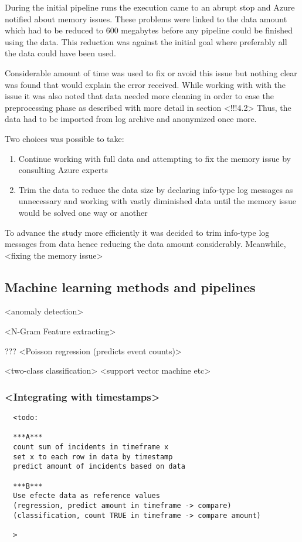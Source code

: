 \documentclass[english, 12pt, a4paper, elec, utf8, a-1b, online]{aaltothesis}
\begin{document}
During the initial pipeline runs
the execution came to an abrupt stop
and Azure notified about memory issues.
These problems were linked to the data amount
which had to be reduced to 600 megabytes
before any pipeline could be finished using the data.
This reduction was against the initial goal
where preferably all the data could have been used.

Considerable amount of time was used
to fix or avoid this issue
but nothing clear was found
that would explain the error received.
While working with with the issue
it was also noted
that data needed more cleaning
in order to ease the preprocessing phase
as described with more detail in section <!!!4.2>
Thus,
the data had to be imported from log archive
and anonymized once more.

Two choices was possible to take:
\begin{enumerate}
  \item Continue working with full data
  and attempting to fix the memory issue
  by consulting Azure experts
  \item  Trim the data to reduce the data size
  by declaring info-type log messages
  as unnecessary
  and working with vastly diminished data
  until the memory issue would be solved
  one way or another
\end{enumerate}

To advance the study more efficiently
it was decided to trim info-type log messages from data
hence reducing the data amount considerably.
Meanwhile,
<fixing the memory issue>

\subsection{Machine learning methods and pipelines}

<anomaly detection>

<N-Gram Feature extracting>

???
<Poisson regression (predicts event counts)>

<two-class classification>
<support vector machine etc>



\subsubsection*{<Integrating with timestamps>}


\begin{verbatim}
  <todo:

  ***A***
  count sum of incidents in timeframe x
  set x to each row in data by timestamp
  predict amount of incidents based on data

  ***B***
  Use efecte data as reference values
  (regression, predict amount in timeframe -> compare)
  (classification, count TRUE in timeframe -> compare amount)

  >
\end{verbatim}
\end{document}
